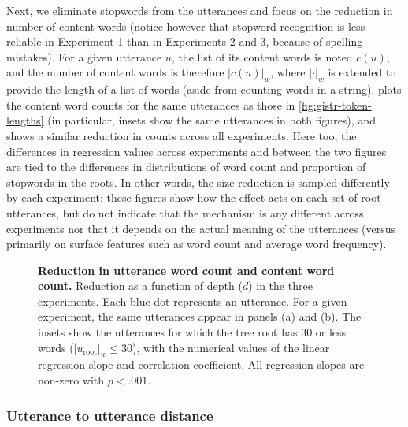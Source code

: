 Next, we eliminate stopwords from the utterances and focus on the
reduction in number of content words (notice however that stopword
recognition is less reliable in Experiment 1 than in Experiments 2 and
3, because of spelling mistakes). For a given utterance \(u\), the list
of its content words is noted \(c(u)\), and the number of content words
is therefore \(|c(u)|_w\), where \(|\cdot|_w\) is extended to provide
the length of a list of words (aside from counting words in a string).
 plots the content word counts for the
same utterances as those in \cref{fig:gistr-token-lengths} (in
particular, insets show the same utterances in both figures), and shows
a similar reduction in counts across all experiments. Here too, the
differences in regression values across experiments and between the two
figures are tied to the differences in distributions of word count and
proportion of stopwords in the roots. In other words, the size reduction
is sampled differently by each experiment: these figures show how the
effect acts on each set of root utterances, but do not indicate that the
mechanism is any different across experiments nor that it depends on the
actual meaning of the utterances (versus primarily on surface features
such as word count and average word frequency).

\begin{figure}[!ht]
  \centering

  \caption[Reduction in utterance word count and content word count]{
  \textbf{Reduction in utterance word count and content word count.}
  Reduction as a function of depth ($d$) in the three experiments.
  Each blue dot represents an utterance.
  For a given experiment, the same utterances appear in panels (a) and (b).
  The insets show the utterances for which the tree root has 30 or less words ($|u_{\text{root}}|_w \leq 30$), with the numerical values of the linear regression slope and correlation coefficient.
  All regression slopes are non-zero with $p < .001$.
  }
  \label{fig:gistr-lengths}
\end{figure}

\subsubsection{Utterance to utterance
distance}\label{utterance-to-utterance-distance}

